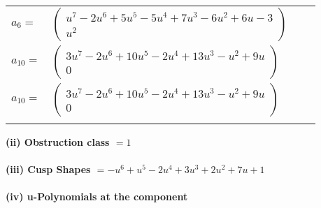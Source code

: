 \documentclass[1p]{elsarticle_modified}
\theoremstyle{definition}
\begin{document}
\begin{tabular}{m{7pt} m{180pt} m{7pt} m{180pt} }
\flushright $a_{6}=$&$\begin{pmatrix}u^7-2 u^6+5 u^5-5 u^4+7 u^3-6 u^2+6 u-3\\u^2\end{pmatrix}$ \\
\flushright $a_{10}=$&$\begin{pmatrix}3 u^7-2 u^6+10 u^5-2 u^4+13 u^3- u^2+9 u\\0\end{pmatrix}$\\ \flushright $a_{10}=$&$\begin{pmatrix}3 u^7-2 u^6+10 u^5-2 u^4+13 u^3- u^2+9 u\\0\end{pmatrix}$\\&\end{tabular}
\flushleft \textbf{(ii) Obstruction class $= 1$}\\~\\
\flushleft \textbf{(iii) Cusp Shapes $= - u^6+u^5-2 u^4+3 u^3+2 u^2+7 u+1$}\\~\\
\newpage\renewcommand{\arraystretch}{1}
\flushleft \textbf{(iv) u-Polynomials at the component}\newline \\
\end{document}
